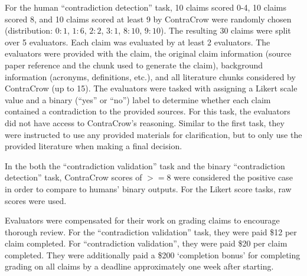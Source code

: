 For the human ``contradiction detection'' task, 10 claims scored 0-4, 10 claims scored 8, and 10 claims scored at least 9 by ContraCrow were randomly chosen (distribution: $0:1$, $1:6$, $2:2$, $3:1$, $8:10$, $9:10$). The resulting 30 claims were split over 5 evaluators. Each claim was evaluated by at least 2 evaluators. The evaluators were provided with the claim, the original claim information (source paper reference and the chunk used to generate the claim), background information (acronyms, definitions, etc.), and all literature chunks considered by ContraCrow (up to 15). The evaluators were tasked with assigning a Likert scale value and a binary (``yes'' or ``no'') label to determine whether each claim contained a contradiction to the provided sources. For this task, the evaluators did not have access to ContraCrow's reasoning. Similar to the first task, they were instructed to use any provided materials for clarification, but to only use the provided literature when making a final decision. 

In the both the ``contradiction validation'' task and the binary ``contradiction detection'' task, ContraCrow scores of $>=8$ were considered the positive case in order to compare to humans' binary outputs. For the Likert score tasks, raw scores were used.

Evaluators were compensated for their work on grading claims to encourage thorough review. For the ``contradiction validation'' task, they were paid \$12 per claim completed. For ``contradiction validation'', they were paid \$20 per claim completed. They were additionally paid a \$200 `completion bonus' for completing grading on all claims by a deadline approximately one week after starting.


